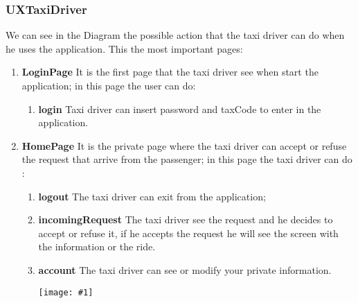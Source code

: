 \documentclass[11pt, a4paper,titlepage]{article}
\newcommand{\image}[1]{
	\begin{center}
		\noindent \texttt{[image: \#1]}
	\end{center}
	}
\begin{document}
	\subsubsection{UXTaxiDriver}
	We can see in the Diagram the possible action that the taxi driver can do when he uses the application.
	This the most important pages:
	\begin{enumerate}
		\item \textbf{LoginPage} It is the first page that the taxi driver see when start the
		application; in this page the user can do:
		\begin{enumerate}
			\item \textbf{login} Taxi driver can insert password and taxCode to enter in the
			application.
		\end{enumerate}
		\item \textbf{HomePage} It is the private page where the taxi driver can accept or refuse the request that arrive from the passenger; in this page the taxi driver can do :
		\begin{enumerate}
			\item \textbf{logout} The taxi driver can exit from the application;
			\item \textbf{incomingRequest} The taxi driver see the request and he decides to accept
			or refuse it, if he accepts the request he will see the screen with the information or the ride.
			\item \textbf{account} The taxi driver can see or modify your private information.
			\image{ux_taxidriver.png}
		\end{enumerate}
	\end{enumerate}
\end{document}
